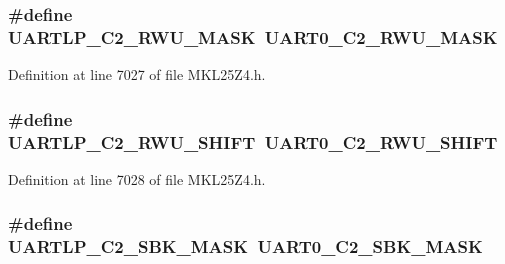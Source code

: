 \subsubsection[{\texorpdfstring{U\+A\+R\+T\+L\+P\+\_\+\+C2\+\_\+\+R\+W\+U\+\_\+\+M\+A\+SK}{UARTLP_C2_RWU_MASK}}]{\setlength{\rightskip}{0pt plus 5cm}\#define U\+A\+R\+T\+L\+P\+\_\+\+C2\+\_\+\+R\+W\+U\+\_\+\+M\+A\+SK~{\bf U\+A\+R\+T0\+\_\+\+C2\+\_\+\+R\+W\+U\+\_\+\+M\+A\+SK}}\hypertarget{group___backward___compatibility___symbols_ga23425daa820ed95ebe0509a11b31712a}{}\label{group___backward___compatibility___symbols_ga23425daa820ed95ebe0509a11b31712a}


Definition at line 7027 of file M\+K\+L25\+Z4.\+h.

\subsubsection[{\texorpdfstring{U\+A\+R\+T\+L\+P\+\_\+\+C2\+\_\+\+R\+W\+U\+\_\+\+S\+H\+I\+FT}{UARTLP_C2_RWU_SHIFT}}]{\setlength{\rightskip}{0pt plus 5cm}\#define U\+A\+R\+T\+L\+P\+\_\+\+C2\+\_\+\+R\+W\+U\+\_\+\+S\+H\+I\+FT~{\bf U\+A\+R\+T0\+\_\+\+C2\+\_\+\+R\+W\+U\+\_\+\+S\+H\+I\+FT}}\hypertarget{group___backward___compatibility___symbols_ga7e3babc97f1d54f154097c1c3c7f9c13}{}\label{group___backward___compatibility___symbols_ga7e3babc97f1d54f154097c1c3c7f9c13}


Definition at line 7028 of file M\+K\+L25\+Z4.\+h.

\subsubsection[{\texorpdfstring{U\+A\+R\+T\+L\+P\+\_\+\+C2\+\_\+\+S\+B\+K\+\_\+\+M\+A\+SK}{UARTLP_C2_SBK_MASK}}]{\setlength{\rightskip}{0pt plus 5cm}\#define U\+A\+R\+T\+L\+P\+\_\+\+C2\+\_\+\+S\+B\+K\+\_\+\+M\+A\+SK~{\bf U\+A\+R\+T0\+\_\+\+C2\+\_\+\+S\+B\+K\+\_\+\+M\+A\+SK}}\hypertarget{group___backward___compatibility___symbols_ga6eae1bd3ccd0ddc022e4b25e685cdcd5}{}\label{group___backward___compatibility___symbols_ga6eae1bd3ccd0ddc022e4b25e685cdcd5}


